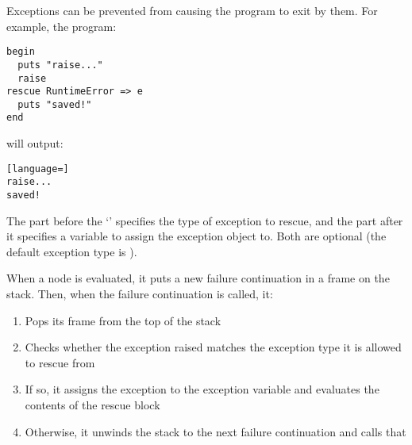 Exceptions can be prevented from causing the program to exit by  them. For example, the program:

\begin{lstlisting}
begin
  puts "raise..."
  raise
rescue RuntimeError => e
  puts "saved!"
end
\end{lstlisting}

will output:

\begin{lstlisting}[language=]
raise...
saved!
\end{lstlisting}

The part before the `\code{=>}' specifies the type of exception to rescue, and the part after it specifies a variable to assign the exception object to. Both are optional (the default exception type is ).

When a  node is evaluated, it puts a new failure continuation in a frame on the stack. Then, when the failure continuation is called, it:

\begin{enumerate}
  \item Pops its frame from the top of the stack
  \item Checks whether the exception raised matches the exception type it is allowed to rescue from
  \item If so, it assigns the exception to the exception variable and evaluates the contents of the rescue block
  \item Otherwise, it unwinds the stack to the next failure continuation and calls that
\end{enumerate}
